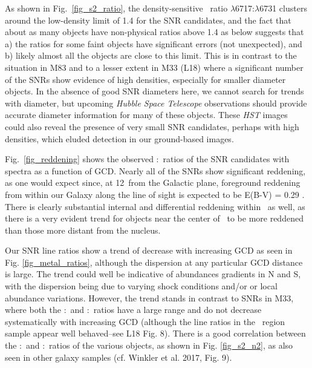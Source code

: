 As shown in Fig.\ \ref{fig_s2_ratio}, the density-sensitive \sii\ ratio  $\lambda$6717:$\lambda$6731 clusters around the low-density limit of 1.4 for the SNR candidates, and  the fact that  about as many objects have non-physical ratios above 1.4 as below suggests that a) the ratios for some faint objects have significant errors (not unexpected), and b) likely  almost all the objects are close to this limit. This is in contrast to the situation in M83 \citep{winkler17} and to a lesser extent in M33 (L18) where a significant number of the SNRs show evidence of high densities, especially for smaller diameter objects. In the absence of good SNR diameters here, we cannot search for trends with diameter, but upcoming {\em Hubble Space Telescope} observations should provide accurate diameter information for many of these objects.  These {\em HST} images could also reveal the presence of very small SNR candidates, perhaps with high densities, which eluded detection in our ground-based images.

Fig.\ \ref{fig_reddening} shows the observed \hb:\ha\ ratios of the SNR candidates with spectra as a function of GCD. Nearly all of the SNRs show significant reddening, as one would expect since, at 12\degr\ from the Galactic plane, foreground reddening from within our Galaxy along the line of sight is expected to be E(B-V) = 0.29 \citep{schlafly11}.  There is clearly substantial internal and differential reddening  within \gal\ as well, as there is a very evident trend for objects near the center of \gal\ to be more reddened than those more distant from the nucleus.







Our SNR line ratios show a  trend of decrease with increasing GCD as seen in Fig. \ref{fig_metal_ratios}, although the dispersion at any particular GCD distance is large.  The trend could well be indicative of abundances gradients in N and S, with the dispersion being due to varying shock conditions and/or or local abundance variations.  However, the trend stands in contrast to SNRs in M33, where both the \nii:\ha\ and \sii:\ha\ ratios have a large range and do not decrease systematically with increasing GCD (although the line ratios in the \hii\ region sample appear well behaved--see L18 Fig. 8).   There is a good correlation between the \nii:\ha\ and \sii:\ha\ ratios of the various objects, as shown in  Fig. \ref{fig_s2_n2}, as also seen in other galaxy samples (cf. Winkler et al. 2017, Fig. 9).

